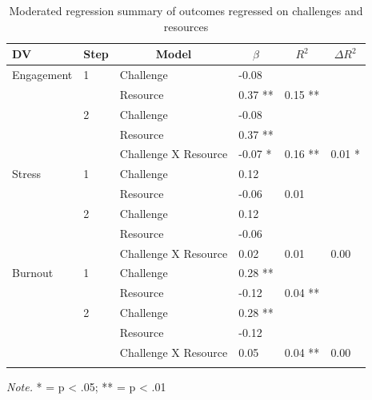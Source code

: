 \documentclass[
  man,mask]{apa7}
\begin{document}
\begin{table}[tbp]

\begin{center}
\begin{threeparttable}

\caption{\label{tab:chal-resource-table}Moderated regression summary of outcomes regressed on challenges and resources}

\begin{tabular}{llllll}
\toprule
DV & \multicolumn{1}{c}{Step} & \multicolumn{1}{c}{Model} & \multicolumn{1}{c}{$\beta$} & \multicolumn{1}{c}{$R^2$} & \multicolumn{1}{c}{$\Delta R^2$}\\
\midrule
Engagement & 1 & Challenge & -0.08 &  & \\
 &  & Resource & 0.37 ** & 0.15 ** & \\
 & 2 & Challenge & -0.08 &  & \\
 &  & Resource & 0.37 ** &  & \\
 &  & Challenge X Resource & -0.07 * & 0.16 ** & 0.01 *\\
Stress & 1 & Challenge & 0.12 &  & \\
 &  & Resource & -0.06 & 0.01 & \\
 & 2 & Challenge & 0.12 &  & \\
 &  & Resource & -0.06 &  & \\
 &  & Challenge X Resource & 0.02 & 0.01 & 0.00\\
Burnout & 1 & Challenge & 0.28 ** &  & \\
 &  & Resource & -0.12 & 0.04 ** & \\
 & 2 & Challenge & 0.28 ** &  & \\
 &  & Resource & -0.12 &  & \\
 &  & Challenge X Resource & 0.05 & 0.04 ** & 0.00\\
\bottomrule
\addlinespace
\end{tabular}

\begin{tablenotes}[para]
\normalsize{\textit{Note.} * = p < .05; ** = p < .01}
\end{tablenotes}

\end{threeparttable}
\end{center}

\end{table}
\end{document}
